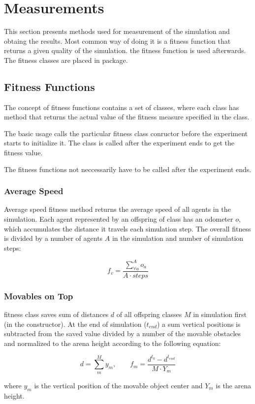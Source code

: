 \section{Measurements}

This section presents methods used for measurement of the simulation and obtaing the results. Most common way of doing it is a fitness function that returns a given quality of the simulation. the fitness function is used afterwards. The fitness classes are placed in  package.


\subsection{Fitness Functions}

The concept of fitness functions contains a set of classes, where each class has  method that returns the actual value of the fitness measure specified in the class.

The basic usage calls the particular fitness class conructor before the experiment starts to initialize it. The  class is called after the experiment ends to get the fitness value.

The fitness functions not neccessarily have to be called after the experiment ends.

\subsubsection{Average Speed}

Average speed fitness  method returns the average speed of all agents in the simulation. Each agent represented by an offspring of  class has an odometer $o$, which accumulates the distance it travels each simulation step. The overall fitness is divided by a number of agents $A$ in the simulation and number of simulation steps:

\begin{equation}
f_v = \frac{\displaystyle\sum_{\forall a}^{A} o_a}{A \cdot steps}
\end{equation}

\subsubsection{Movables on Top}

 fitness class saves sum of distances $d$ of all  offspring classes $M$ in simulation first (in the constructor). At the end of simulation ($t_{end}$) a sum vertical positions is subtracted from the saved value divided by a number of the movable obstacles and normalized to the arena height according to the following equation:

\begin{equation}
d = \displaystyle\sum_{m}^{M} y_m,\qquad
f_m = \frac{d^{t_0} - d^{t_{end}}}{M \cdot Y_{m}}
\end{equation}

where $y_m$ is the vertical position of the movable object center and $Y_m$ is the arena height.

